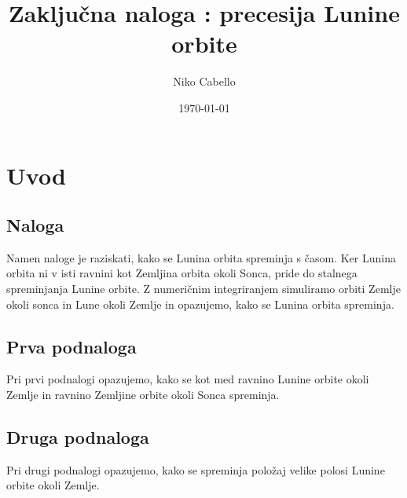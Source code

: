 \documentclass[titlepage,12pt,a4paper]{article}
\title{Zaključna naloga : precesija Lunine orbite}
\author{Niko Cabello}
\date{\today}
\begin{document}
\maketitle
\tableofcontents

\newpage

\section{Uvod}
\label{sec : Uvod}
\subsection{Naloga}
\label{subsec : Naloga}
Namen naloge je raziskati, kako se Lunina orbita spreminja s časom. Ker Lunina orbita ni v isti ravnini kot Zemljina orbita okoli Sonca, pride do stalnega spreminjanja Lunine orbite. Z numeričnim integriranjem simuliramo orbiti Zemlje okoli sonca in Lune okoli Zemlje in opazujemo, kako se Lunina orbita spreminja.

\subsection{Prva podnaloga}
Pri prvi podnalogi opazujemo, kako se kot med ravnino Lunine orbite okoli Zemlje in ravnino Zemljine orbite okoli Sonca spreminja.
\subsection{Druga podnaloga}
Pri drugi podnalogi opazujemo, kako se spreminja položaj velike polosi Lunine orbite okoli Zemlje.
\end{document}
